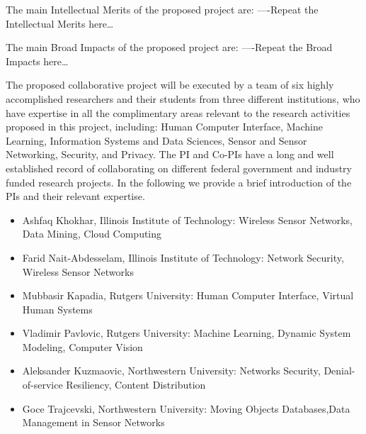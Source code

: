 The main Intellectual Merits of the proposed project are:
----Repeat the Intellectual Merits here…

The main Broad Impacts of the proposed project are:
----Repeat the Broad Impacts here…

The proposed collaborative project will be executed by a team of six highly accomplished researchers and their students from three different institutions, who have expertise in all the complimentary areas relevant to the research activities proposed in this project, including: Human Computer Interface, Machine Learning, Information Systems and Data Sciences, Sensor and Sensor Networking, Security, and Privacy. The PI and Co-PIs have a long and well established record of collaborating on different federal government and industry funded  research projects. In the following we provide a brief introduction of the PIs and their relevant expertise.
\begin{itemize}
\vspace{-3mm} \item Ashfaq Khokhar, Illinois Institute of Technology: Wireless Sensor Networks, Data Mining, Cloud Computing
\vspace{-3mm} \item Farid Nait-Abdesselam, Illinois Institute of Technology: Network Security, Wireless Sensor Networks
\vspace{-3mm} \item Mubbasir Kapadia, Rutgers University: Human Computer Interface, Virtual Human Systems
\vspace{-3mm} \item Vladimir Pavlovic, Rutgers University: Machine Learning, Dynamic System Modeling, Computer Vision
\vspace{-3mm} \item Aleksander Kuzmaovic, Northwestern University: Networks Security, Denial-of-service Resiliency, Content Distribution
\vspace{-3mm} \item Goce Trajcevski, Northwestern University: Moving Objects Databases,Data Management in Sensor Networks
\end{itemize}



